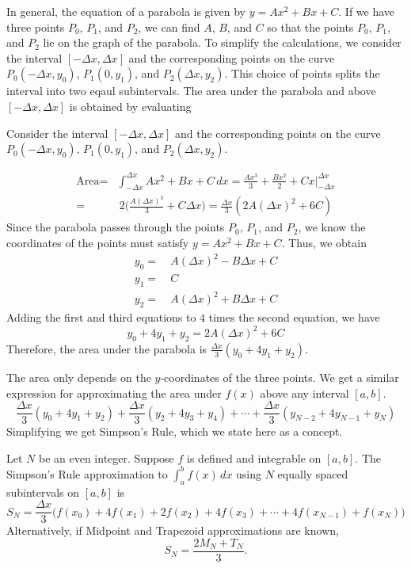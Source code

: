 In general, the equation of a parabola is given by $y=Ax^2+Bx+C$. If we have three points $P_0$, $P_1$, and $P_2$, we can find $A$, $B$, and $C$ so that the points $P_0$, $P_1$, and $P_2$ lie on the graph of the parabola. To simplify the calculations, we consider the interval $[-\Delta x, \Delta x]$ and the corresponding points on the curve $P_0(-\Delta x, y_0)$, $P_1(0,y_1)$, and $P_2(\Delta x, y_2)$. This choice of points splits the interval into two eqaul subintervals. The area under the parabola and above $[-\Delta x, \Delta x]$ is obtained by evaluating

\begin{marginfigure} %
\caption{Consider the interval $[-\Delta x, \Delta x]$ and the corresponding points on the curve $P_0(-\Delta x, y_0)$, $P_1(0,y_1)$, and $P_2(\Delta x, y_2)$.}
\label{F:5.6.simpsonb}
\end{marginfigure}

\begin{align*}
 \text{Area} = & \int_{-\Delta x}^{\Delta x} Ax^2+Bx+C \, dx = \frac{Ax^3}{3}+\frac{Bx^2}{2}+Cx \Big\vert_{-\Delta x}^{\Delta x} \\
 =& \ 2 \Big( \frac{A(\Delta x)^3}{3} + C\Delta x\Big) = \frac{\Delta x}{3}( 2A(\Delta x)^2 + 6C)
\end{align*}
Since the parabola passes through the points $P_0$, $P_1$, and $P_2$, we know the coordinates of the points must satisfy $y=Ax^2+Bx+C$. Thus, we obtain 
\begin{align*}
y_0 =& \  A(\Delta x)^2 - B \Delta x + C \\
y_1 =& \ C \\
y_2 =& \ A(\Delta x)^2 + B \Delta x + C
\end{align*}     
Adding the first and third equations to $4$ times the second equation, we have 
$$ y_0 + 4y_1 + y_2 = 2A(\Delta x)^2 + 6C $$
Therefore, the area under the parabola is $\frac{\Delta x}{3}(y_0 + 4y_1 + y_2)$.

The area only depends on the $y$-coordinates of the three points. We get a similar expression for approximating the area under $f(x)$ above any interval $[a,b]$.\small
$$ \frac{\Delta x}{3}(y_0 + 4y_1 + y_2) + \frac{\Delta x}{3}(y_2 + 4y_3 + y_4) + \cdots + \frac{\Delta x}{3}(y_{N-2} + 4y_{N-1} + y_N)$$\normalsize
Simplifying we get Simpson's Rule, which we state here as a concept.

{Let $N$ be an even integer. Suppose $f$ is defined and integrable on $[a,b]$. The Simpson's Rule approximation to $\int_a^b f(x) \, dx$ using $N$ equally spaced subintervals on $[a,b]$ is \small
$$ S_N = \frac{\Delta x}{3} \Big( f(x_0) + 4f(x_1) + 2f(x_2) + 4f(x_3) + \cdots + 4f(x_{N-1}) + f(x_N) \Big) $$ \normalsize
Alternatively, if Midpoint and Trapezoid approximations are known, 
$$S_N = \frac{2M_N + T_N}{3}. $$
} %

